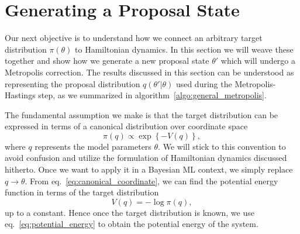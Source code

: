\section{Generating a Proposal State}
Our next objective is to understand how we connect an arbitrary target distribution $\pi(\theta)$
to Hamiltonian dynamics. In this section we will weave these together and show how we
generate a new proposal state $\theta'$ which will undergo a Metropolis correction.
The results discussed in this section can be understood as representing the proposal distribution $q(\theta'|\theta)$ used during the Metropolis-Hastings step,
as we summarized in algorithm~\ref{algo:general_metropolis}. 

The fundamental assumption we make is that the target distribution can be expressed in terms of a
canonical distribution over coordinate space
\begin{equation}\label{eq:canonical_coordinate}
  \pi(q) \propto \exp\left\{-V(q)\right\},
\end{equation}
where $q$ represents the model parameters $\theta$. We will stick to this convention to avoid confusion and 
utilize the formulation of Hamiltonian dynamics discussed hitherto. Once we want to apply it in a Bayesian ML context,
we simply replace $q \to \theta$. From eq.~\eqref{eq:canonical_coordinate}, we can find the potential
energy function in terms of the target distribution
\begin{equation}\label{eq:potential_energy}
  V(q) = - \log \pi(q),
\end{equation}
up to a constant. Hence once the target distribution is known,
we use eq.~\eqref{eq:potential_energy} to obtain the potential energy of the system.

